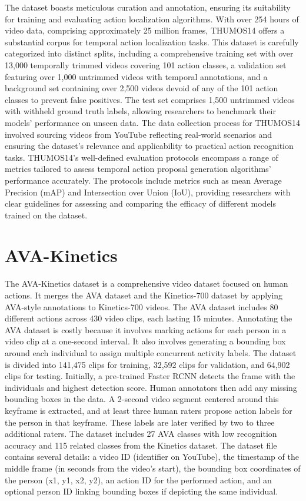 The dataset boasts meticulous curation and annotation, ensuring its suitability for training and evaluating action localization algorithms. With over 254 hours of video data, comprising approximately 25 million frames, THUMOS14 offers a substantial corpus for temporal action localization tasks. This dataset is carefully categorized into distinct splits, including a comprehensive training set with over 13,000 temporally trimmed videos covering 101 action classes, a validation set featuring over 1,000 untrimmed videos with temporal annotations, and a background set containing over 2,500 videos devoid of any of the 101 action classes to prevent false positives. The test set comprises 1,500 untrimmed videos with withheld ground truth labels, allowing researchers to benchmark their models' performance on unseen data. The data collection process for THUMOS14 involved sourcing videos from YouTube reflecting real-world scenarios and ensuring the dataset's relevance and applicability to practical action recognition tasks. THUMOS14's well-defined evaluation protocols encompass a range of metrics tailored to assess temporal action proposal generation algorithms' performance accurately. The protocols include metrics such as mean Average Precision (mAP) and Intersection over Union (IoU), providing researchers with clear guidelines for assessing and comparing the efficacy of different models trained on the dataset.

\section{AVA-Kinetics}
The AVA-Kinetics dataset \parencite{ava-kinetics} is a comprehensive video dataset focused on human actions. It merges the AVA dataset and the Kinetics-700 dataset by applying AVA-style annotations to Kinetics-700 videos. The AVA dataset includes 80 different actions across 430 video clips, each lasting 15 minutes. Annotating the AVA dataset is costly because it involves marking actions for each person in a video clip at a one-second interval. It also involves generating a bounding box around each individual to assign multiple concurrent activity labels. The dataset is divided into 141,475 clips for training, 32,592 clips for validation, and 64,902 clips for testing.
Initially, a pre-trained Faster RCNN detects the frame with the individuals and highest detection score. Human annotators then add any missing bounding boxes in the data. A 2-second video segment centered around this keyframe is extracted, and at least three human raters propose action labels for the person in that keyframe. These labels are later verified by two to three additional raters.
The dataset includes 27 AVA classes with low recognition accuracy and 115 related classes from the Kinetics dataset. The dataset file contains several details: a video ID (identifier on YouTube), the timestamp of the middle frame (in seconds from the video's start), the bounding box coordinates of the person (x1, y1, x2, y2), an action ID for the performed action, and an optional person ID linking bounding boxes if depicting the same individual. 

